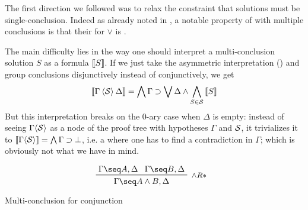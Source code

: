 The first direction we followed was to relax the constraint that solutions must
be single-conclusion. Indeed as already noted in , a
notable property of  with multiple conclusions is that their
 for $\lor$ is .

The main difficulty lies in the way one should interpret a multi-conclusion
solution $S$ as a formula $\left\llbracket S \right\rrbracket$. If we just take the asymmetric
interpretation () and group conclusions disjunctively instead of
conjunctively, we get
$$
\left\llbracket \Gamma \mathbin{\langle \mathcal{S} \rangle} \Delta \right\rrbracket =
\bigwedge \Gamma \supset \bigvee \Delta \land \bigwedge_{S \in \mathcal{S}}{\left\llbracket S \right\rrbracket}
$$
But this interpretation breaks on the 0-ary case when $\Delta$ is empty: instead
of seeing $\Gamma \mathbin{\langle \mathcal{S} \rangle}$ as a node of the proof tree with hypotheses
$\Gamma$ and  $\mathcal{S}$, it trivializes it to $\left\llbracket \Gamma
\mathbin{\langle \mathcal{S} \rangle} \right\rrbracket = \bigwedge \Gamma \supset \bot$, i.e. a  where one has to
find a contradiction in $\Gamma$; which is obviously not what we have in mind.

\begin{marginfigure}
  $$
  \R[\land R*]
    {\Gamma \seq A, \Delta}
    {\Gamma \seq B, \Delta}
    {\Gamma \seq A \land B, \Delta}
  $$
  \caption{Multi-conclusion  for conjunction}
\end{marginfigure}

